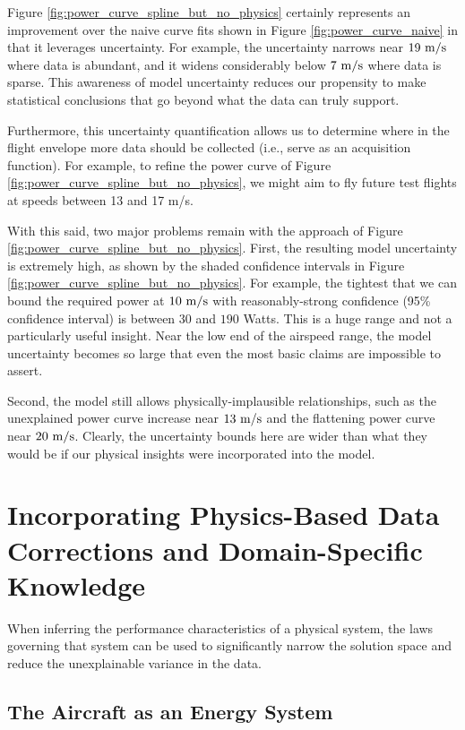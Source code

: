 Figure \ref{fig:power_curve_spline_but_no_physics} certainly represents an improvement over the naive curve fits shown in Figure \ref{fig:power_curve_naive} in that it leverages uncertainty. For example, the uncertainty narrows near $19\ \rm m/s$ where data is abundant, and it widens considerably below $7\ \rm m/s$ where data is sparse. This awareness of model uncertainty reduces our propensity to make statistical conclusions that go beyond what the data can truly support.

Furthermore, this uncertainty quantification allows us to determine where in the flight envelope more data should be collected (i.e., serve as an acquisition function). For example, to refine the power curve of Figure \ref{fig:power_curve_spline_but_no_physics}, we might aim to fly future test flights at speeds between 13 and 17 m/s.

With this said, two major problems remain with the approach of Figure \ref{fig:power_curve_spline_but_no_physics}. First, the resulting model uncertainty is extremely high, as shown by the shaded confidence intervals in Figure \ref{fig:power_curve_spline_but_no_physics}. For example, the tightest that we can bound the required power at $10\ \rm m/s$ with reasonably-strong confidence (95\% confidence interval) is between $30$ and $190$ Watts. This is a huge range and not a particularly useful insight. Near the low end of the airspeed range, the model uncertainty becomes so large that even the most basic claims are impossible to assert.

Second, the model still allows physically-implausible relationships, such as the unexplained power curve increase near $13\ \rm m/s$ and the flattening power curve near $20\ \rm m/s$. Clearly, the uncertainty bounds here are wider than what they would be if our physical insights were incorporated into the model.


\section{Incorporating Physics-Based Data Corrections and Domain-Specific Knowledge}
\label{sec:physics_based_corrections}

When inferring the performance characteristics of a physical system, the laws governing that system can be used to significantly narrow the solution space and reduce the unexplainable variance in the data.

\subsection{The Aircraft as an Energy System}

